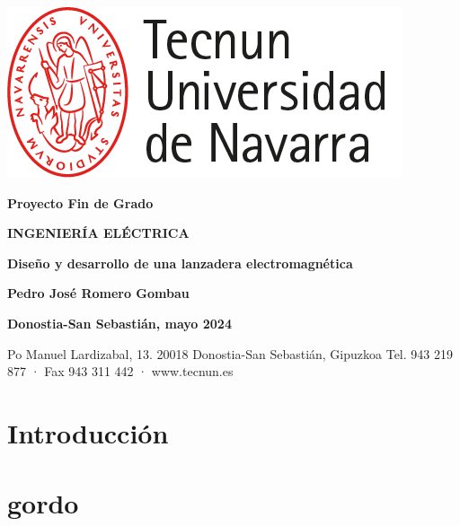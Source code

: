 \documentclass[a4paper,12pt]{article}
\newcommand{\boldcenteredtext}[1]{
  \begin{center}
    \textbf{\fontsize{12pt}{14pt}\selectfont #1}
  \end{center}
}
\newcommand{\largeboldcenteredtext}[1]{
  \begin{center}
    \textbf{\fontsize{16pt}{18pt}\selectfont #1}
  \end{center}
}
\newcommand{\boldrightalignedtext}[1]{
  \begin{flushright}
    \textbf{\fontsize{12pt}{14pt}\selectfont #1}
  \end{flushright}
}
\newcommand{\centeredtext}[1]{
  \begin{center}
    \fontsize{12pt}{14pt}\selectfont #1
  \end{center}
}
\begin{document}
\pagestyle{empty}

\begin{center}
  \includegraphics[width=0.4\linewidth, height=0.1\textheight]{FigurasMemoria/logoTecnun.png}
\end{center}

\vspace{1cm}

\boldcenteredtext{Proyecto Fin de Grado}

\largeboldcenteredtext{INGENIERÍA ELÉCTRICA}

\vspace{6cm}

\largeboldcenteredtext{Diseño y desarrollo de una lanzadera electromagnética}

\vspace{8cm}

\boldrightalignedtext{Pedro José Romero Gombau}
\boldrightalignedtext{Donostia-San Sebastián, mayo 2024}

\vspace{0.6cm}

\centeredtext{Po Manuel Lardizabal, 13. 20018 Donostia-San Sebastián, Gipuzkoa Tel. 943 219 877 · Fax 943 311 442 · www.tecnun.es}

\newpage
\thispagestyle{empty}
\mbox{}

\newpage
\thispagestyle{empty}
\tableofcontents

\newpage
\thispagestyle{empty}
\listoffigures

\newpage
\thispagestyle{empty}
\listoftables

\newpage
\thispagestyle{plain}
\section{Introducción}
\section{gordo}
\end{document}
